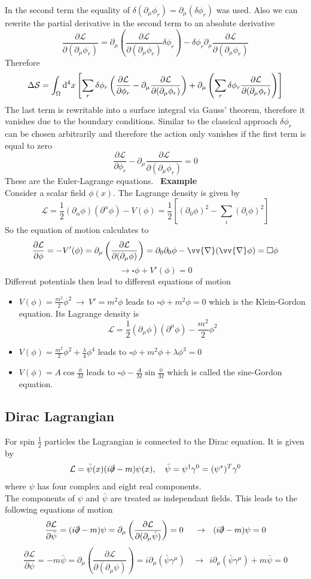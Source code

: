 \documentclass{include/thesisclass}
\newcommand{\LL}{\mathcal{L}}
\newcommand{\SSS}{\mathcal{S}}
\newcommand{\df}{\rightarrow}
\newcommand{\dd}{{\rm d}}
\newcommand{\p}{\partial}
\newcommand{\vn}{\vv{\nabla}}
\newcommand{\dslash}{\slashed{\partial}}
\newcommand{\sub}[1]{~\newline\newline\textbf{#1}\\}
\begin{document}
In the second term the equality of $\delta (\p _\mu \phi_r) = \p_\mu(\delta \phi_r)$ was used. Also we can rewrite the partial derivative in the second term to an absolute derivative
\[
\frac{\p \LL}{\p(\p_\mu \phi_r)} = \p_\mu \left( \frac{\p \LL}{\p ( \p_\mu \phi_r)} \delta\phi_r\right) - \delta \phi_r \p_\mu \frac{\p \LL}{\p(\p_\mu \phi_r)}
\]
Therefore
\[
\Delta \SSS = \int_\Omega \dd ^4 x \left[ \sum_r \delta \phi_r \left( \frac{\p \LL}{\p \phi_r} - \p_\mu \frac{\p \LL}{\p(\p_\mu \phi_r)}\right) + \p_\mu \left( \sum_r \delta \phi_r \frac{\p \LL}{\p(\p_\mu \phi_r)} \right)\right]
\]
The last term is rewritable into a surface integral via Gauss' theorem, therefore it vanishes due to the boundary conditions. Similar to the classical approach $\delta \phi_r$ can be chosen arbitrarily and therefore the action only vanishes if the first term is equal to zero
\[ 
\frac{\p \LL}{\p \phi_r} - \p_\mu \frac{\p \LL}{\p(\p_\mu \phi_r)} = 0
\]
These are the Euler-Lagrange equations.
\sub{Example}
Consider a scalar field $\phi(x)$. The Lagrange density is given by
\[ \LL = \frac{1}{2} (\p_\alpha \phi)(\p^\alpha \phi) - V(\phi) = \frac{1}{2} \left[ (\p_0\phi)^2 - \sum_i (\p_i \phi)^2\right]\]
So the equation of motion calculates to
\[ \frac{\p \LL}{\p \phi} = - V'(\phi) = \p_\mu \left( \frac{\p \LL}{\p(\p_\mu \phi)}\right) = \p_0 \p_0 \phi - \vn(\vn \phi) = \square \phi\]
\[\df \square \phi + V'(\phi) = 0\]
Different potentials then lead to different equations of motion
\begin{itemize}
\item $V(\phi) = \frac{m^2}{2}\phi^2 ~\df~ V' = m^2\phi$ leads to $\square\phi + m^2 \phi = 0$
which is the Klein-Gordon equation. Its Lagrange density is
\[ \LL = \frac{1}{2} (\p_\mu \phi)(\p^\mu \phi) - \frac{m^2}{2}\phi^2\]
\item $V(\phi) = \frac{m^2}{2}\phi^2 + \frac{\lambda}{4}\phi^4$ leads to $\square \phi + m^2 \phi + \lambda \phi^3  = 0$
\item $V(\phi) = A \cos \frac{\phi}{M}$ leads to $\square\phi - \frac{A}{M} \sin \frac{\phi}{M}$
which is called the sine-Gordon equation.
\end{itemize}

\subsection{Dirac Lagrangian}
For spin $\frac{1}{2}$ particles the Lagrangian is connected to the Dirac equation. It is given by
\[ \LL = \bar{\psi}(x)(i \dslash - m) \psi(x),~~~\bar{\psi} = \psi^\dagger \gamma^0 = (\psi^*)^T \gamma^0\]
where $\psi$ has four complex and eight real components.\\
The components of $\psi$ and $\bar{\psi}$ are treated as independant fields. This leads to the following equations of motion
\[ \frac{\p \LL}{\p \bar{\psi}} = ( i \dslash - m)\psi = \p_\mu \left( \frac{\p \LL}{\p(\p_\mu \bar{\psi})}\right) = 0~~~~\df ~~ (i \dslash - m) \psi = 0\]
\[ \frac{\p\LL}{\p\psi} = -m \bar{\psi} = \p_\mu\left( \frac{\p\LL}{\p(\p_\mu \psi)}\right) = i \p_\mu(\bar{\psi}\gamma^\mu)~~~~\df ~~ i \p_\mu(\bar{\psi}\gamma^\mu) + m \bar{\psi} = 0\]
\end{document}
